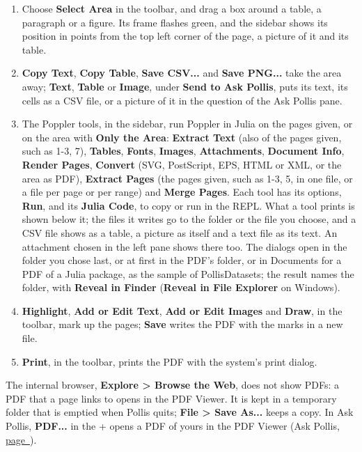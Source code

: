 \documentclass[10pt,a4paper,twoside]{article}
\newcommand{\pg}[1]{\hyperlink{topic:#1}{page~\pageref*{topic:#1}}}
\newcommand{\ui}[1]{\textbf{#1}}
\begin{document}
\begin{enumerate}[label=\arabic*.]
  \item Choose \ui{Select Area} in the toolbar, and drag a box around a table, a paragraph or a figure. Its
    frame flashes green, and the sidebar shows its position in points from the top left corner of the page,
    a picture of it and its table.
  \item \ui{Copy Text}, \ui{Copy Table}, \ui{Save CSV...} and \ui{Save PNG...} take the area away;
    \ui{Text}, \ui{Table} or \ui{Image}, under \ui{Send to Ask Pollis}, puts its text, its cells as a CSV
    file, or a picture of it in the question of the Ask Pollis pane.
  \item The Poppler tools, in the sidebar, run Poppler in Julia on the pages given, or on the area with
    \ui{Only the Area}: \ui{Extract Text} (also of the pages given, such as 1-3, 7), \ui{Tables},
    \ui{Fonts}, \ui{Images}, \ui{Attachments}, \ui{Document Info}, \ui{Render Pages}, \ui{Convert} (SVG, PostScript, EPS, HTML or XML, or the area as PDF), \ui{Extract Pages} (the pages
    given, such as 1-3, 5, in one file, or a file per page or per range) and \ui{Merge Pages}. Each tool has its options, \ui{Run}, and its \ui{Julia Code}, to copy or run in the
    REPL. What a tool prints is shown below it; the files it writes go to the folder or the file you choose,
    and a CSV file shows as a table, a picture as itself and a text file as its text. An attachment chosen in
    the left pane shows there too. The dialogs open in the folder you chose last, or at first in the PDF's
    folder, or in Documents for a PDF of a Julia package, as the sample of PollisDatasets; the result names
    the folder, with \ui{Reveal in Finder} (\ui{Reveal in File Explorer} on Windows).
  \item \ui{Highlight}, \ui{Add or Edit Text}, \ui{Add or Edit Images} and \ui{Draw}, in the toolbar, mark up the
    pages; \ui{Save} writes the PDF with the marks in a new file.
  \item \ui{Print}, in the toolbar, prints the PDF with the system's print dialog.
\end{enumerate}
The internal browser, \ui{Explore > Browse the Web}, does not show PDFs: a PDF that a page links to opens in the PDF
Viewer. It is kept in a
temporary folder that is emptied when Pollis quits; \ui{File > Save As...} keeps a copy. In Ask Pollis, \ui{PDF...} in the + opens a PDF of yours in the PDF Viewer (Ask Pollis,
\pg{Ask Pollis}).
\end{document}
